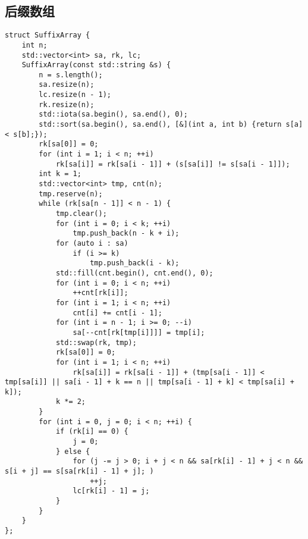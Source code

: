 \subsection{后缀数组}
\begin{lstlisting}
struct SuffixArray {
    int n;
    std::vector<int> sa, rk, lc;
    SuffixArray(const std::string &s) {
        n = s.length();
        sa.resize(n);
        lc.resize(n - 1);
        rk.resize(n);
        std::iota(sa.begin(), sa.end(), 0);
        std::sort(sa.begin(), sa.end(), [&](int a, int b) {return s[a] < s[b];});
        rk[sa[0]] = 0;
        for (int i = 1; i < n; ++i)
            rk[sa[i]] = rk[sa[i - 1]] + (s[sa[i]] != s[sa[i - 1]]);
        int k = 1;
        std::vector<int> tmp, cnt(n);
        tmp.reserve(n);
        while (rk[sa[n - 1]] < n - 1) {
            tmp.clear();
            for (int i = 0; i < k; ++i)
                tmp.push_back(n - k + i);
            for (auto i : sa)
                if (i >= k)
                    tmp.push_back(i - k);
            std::fill(cnt.begin(), cnt.end(), 0);
            for (int i = 0; i < n; ++i)
                ++cnt[rk[i]];
            for (int i = 1; i < n; ++i)
                cnt[i] += cnt[i - 1];
            for (int i = n - 1; i >= 0; --i)
                sa[--cnt[rk[tmp[i]]]] = tmp[i];
            std::swap(rk, tmp);
            rk[sa[0]] = 0;
            for (int i = 1; i < n; ++i)
                rk[sa[i]] = rk[sa[i - 1]] + (tmp[sa[i - 1]] < tmp[sa[i]] || sa[i - 1] + k == n || tmp[sa[i - 1] + k] < tmp[sa[i] + k]);
            k *= 2;
        }
        for (int i = 0, j = 0; i < n; ++i) {
            if (rk[i] == 0) {
                j = 0;
            } else {
                for (j -= j > 0; i + j < n && sa[rk[i] - 1] + j < n && s[i + j] == s[sa[rk[i] - 1] + j]; )
                    ++j;
                lc[rk[i] - 1] = j;
            }
        }
    }
};
\end{lstlisting}


